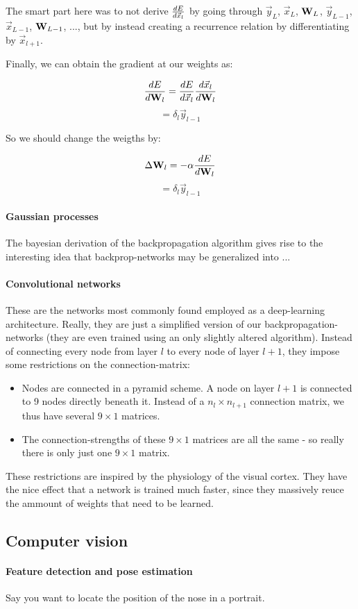 The smart part here was to not derive $  \frac{ \mathop{dE} }{ \mathop{d\vec{x}_l} }  $ by going through $\vec{y}_L$, $\vec{x}_L$, $\mathbf{W}_L$, $\vec{y}_{L-1}$, $\vec{x}_{L-1}$, $\mathbf{W}_{L-1}$, ..., but by instead creating a recurrence relation by differentiating by $\vec{x}_{l+1}$.

Finally, we can obtain the gradient at our weights as: 

$$  \frac{ \mathop{dE} }{ \mathop{d\mathbf{W}_l} }  =  \frac{ \mathop{dE} }{ \mathop{d\vec{x}_l} }   \frac{ \mathop{d\vec{x}_l} }{ \mathop{d\mathbf{W}_l} }  $$
$$ = \delta_l \vec{y}_{l-1} $$

So we should change the weigths by: 

$$ \Delta \mathbf{W}_l = - \alpha  \frac{ \mathop{dE} }{ \mathop{d\mathbf{W}_l} }  $$
$$ = \delta_l \vec{y}_{l-1} $$


\paragraph{Gaussian processes}

The bayesian derivation of the backpropagation algorithm gives rise to the interesting idea that backprop-networks may be generalized into ...

\paragraph{Convolutional networks}

These are the networks most commonly found employed as a deep-learning architecture. Really, they are just a simplified version of our backpropagation-networks (they are even trained using an only slightly altered algorithm). Instead of connecting every node from layer $l$ to every node of layer $l+1$, they impose some restrictions on the connection-matrix:
\begin{itemize}
	\item Nodes are connected in a pyramid scheme. A node on layer $l+1$ is connected to 9 nodes directly beneath it. Instead of a $n_l \times n_{l+1}$ connection matrix, we thus have several $9 \times 1$ matrices.
	\item The connection-strengths of these  $9 \times 1$ matrices are all the same - so really there is only just one  $9 \times 1$ matrix. 
\end{itemize}
These restrictions are inspired by the physiology of the visual cortex. They have the nice effect that a network is trained much faster, since they massively reuce the ammount of weights that need to be learned. 

\subsection{Computer vision}

\paragraph{Feature detection and pose estimation}

Say you want to locate the position of the nose in a portrait. 
